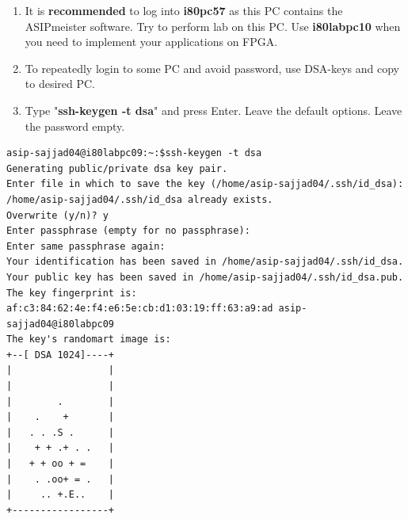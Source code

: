 \documentclass[
]{article}
\begin{document}
\begin{enumerate}
\def\labelenumi{\arabic{enumi}.}
\setcounter{enumi}{7}
\item
  It is \textbf{recommended} to log into \textbf{i80pc57} as this PC
  contains the ASIPmeister software. Try to perform lab on this PC. Use
  \textbf{i80labpc10} when you need to implement your applications on
  FPGA.
\item
  To repeatedly login to some PC and avoid password, use DSA-keys and
  copy to desired PC.
\item
  Type "\textbf{ssh-keygen -t dsa}" and press Enter. Leave the default
  options. Leave the password empty.
\end{enumerate}
\begin{lstlisting}
asip-sajjad04@i80labpc09:~:$ssh-keygen -t dsa
Generating public/private dsa key pair.
Enter file in which to save the key (/home/asip-sajjad04/.ssh/id_dsa):
/home/asip-sajjad04/.ssh/id_dsa already exists.
Overwrite (y/n)? y
Enter passphrase (empty for no passphrase):
Enter same passphrase again:
Your identification has been saved in /home/asip-sajjad04/.ssh/id_dsa.
Your public key has been saved in /home/asip-sajjad04/.ssh/id_dsa.pub.
The key fingerprint is:
af:c3:84:62:4e:f4:e6:5e:cb:d1:03:19:ff:63:a9:ad asip-sajjad04@i80labpc09
The key's randomart image is:
+--[ DSA 1024]----+
|                 |
|                 |
|        .        |
|    .    +       |
|   . . .S .      |
|    + + .+ . .   |
|   + + oo + =    |
|    . .oo+ = .   |
|     .. +.E..    |
+-----------------+
\end{lstlisting}
\end{document}
